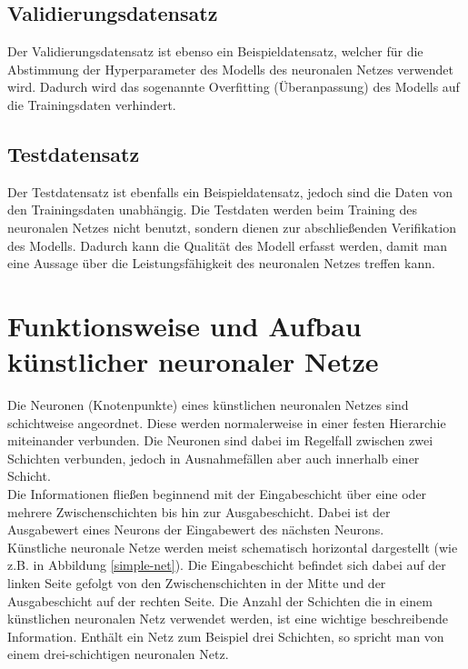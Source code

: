 \subsection{Validierungsdatensatz}

Der Validierungsdatensatz ist ebenso ein Beispieldatensatz, welcher für die Abstimmung der Hyperparameter des Modells des neuronalen Netzes verwendet wird. Dadurch wird das sogenannte \glqq Overfitting\grqq{} (Überanpassung) des Modells auf die Trainingsdaten verhindert. \cite{datasolut} \\

\subsection{Testdatensatz}

Der Testdatensatz ist ebenfalls ein Beispieldatensatz, jedoch sind die Daten von den Trainingsdaten unabhängig. Die Testdaten werden beim Training des neuronalen Netzes nicht benutzt, sondern dienen zur abschließenden Verifikation des Modells. Dadurch kann die Qualität des Modell erfasst werden, damit man eine Aussage über die Leistungsfähigkeit des neuronalen Netzes treffen kann. \cite{datasolut} \\

\section{Funktionsweise und Aufbau künstlicher neuronaler Netze}

Die Neuronen (Knotenpunkte) eines künstlichen neuronalen Netzes sind schichtweise angeordnet. Diese werden normalerweise in einer festen Hierarchie miteinander verbunden. Die Neuronen sind dabei im Regelfall zwischen zwei Schichten verbunden, jedoch in Ausnahmefällen aber auch innerhalb einer Schicht. \cite{jaai} \\

Die Informationen fließen beginnend mit der Eingabeschicht über eine oder mehrere Zwischenschichten bis hin zur Ausgabeschicht. Dabei ist der Ausgabewert eines Neurons der Eingabewert des nächsten Neurons. \cite{jaai} \\

Künstliche neuronale Netze werden meist schematisch horizontal dargestellt (wie z.B. in Abbildung \ref{simple-net}). Die Eingabeschicht befindet sich dabei auf der linken Seite  gefolgt von den Zwischenschichten in der Mitte und der Ausgabeschicht auf der rechten Seite.
Die Anzahl der Schichten die in einem künstlichen neuronalen Netz verwendet werden, ist eine wichtige beschreibende Information. Enthält ein Netz zum Beispiel drei Schichten, so spricht man von einem drei-schichtigen neuronalen Netz. \cite{jaai}

